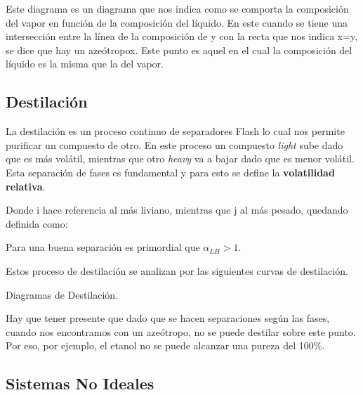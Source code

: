 Este diagrama es un diagrama que nos indica como se comporta la composición del vapor en función de la composición del líquido.
En este cuando se tiene una intersección entre la línea de la composición de y con la recta que nos indica x=y, se dice que hay un azeótropox. Este punto es aquel en el cual la composición del líquido es la misma que la del vapor.
\clearpage
\subsection{Destilación}

La destilación es un proceso continuo de separadores Flash lo cual nos permite purificar un compuesto de otro.
En este proceso un compuesto \textit{light} sube dado que es más volátil, mientras que otro \textit{heavy} va a bajar dado que es menor volátil. Esta separación de fases es fundamental y para esto se define la \textbf{volatilidad relativa}.


Donde i hace referencia al más liviano, mientras que j al más pesado, quedando definida como:


Para una buena separación es primordial que $\alpha_{LH}>1$.

Estos proceso de destilación se analizan por las siguientes curvas de destilación.

\begin{images}{Diagramas de Destilación.}
\end{images}

Hay que tener presente que dado que se hacen separaciones según las fases, cuando nos encontramos con un azeótropo, no se puede destilar sobre este punto. Por eso, por ejemplo, el etanol no se puede alcanzar una pureza del 100\%.

\subsection{Sistemas No Ideales}

